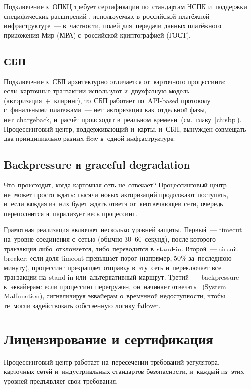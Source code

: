 Подключение к~ОПКЦ требует сертификации по~стандартам НСПК
и~поддержки специфических расширений , используемых
в~российской платёжной инфраструктуре~--- в~частности, полей
для~передачи данных платёжного приложения Мир (МРА)
с~российской криптографией (ГОСТ).

\subsection*{СБП}

Подключение к~СБП архитектурно отличается от~карточного
процессинга: если~карточные транзакции используют 
и~двухфазную модель (авторизация~+~клиринг), то~СБП работает
по~API-based протоколу с~финальными платежами~--- нет~авторизации
как~отдельной фазы, нет~chargeback, и~расчёт происходит
в~реальном времени~(см.~главу~\ref{ch:sbp}). Процессинговый
центр, поддерживающий и~карты, и~СБП, вынужден совмещать
два принципиально разных flow в~одной инфраструктуре.

\subsection*{Backpressure и graceful degradation}

Что~происходит, когда карточная сеть не~отвечает? Процессинговый
центр не~может просто ждать: тысячи новых авторизаций продолжают
поступать, и~если каждая из~них будет ждать ответа от~неотвечающей
сети, очередь переполнится и~парализует весь процессинг.

Грамотная реализация включает несколько уровней защиты.
Первый~--- timeout на~уровне соединения с~сетью (обычно
30--60~секунд), после которого транзакция либо~отклоняется,
либо~переводится в~stand-in. Второй~--- circuit breaker:
если доля timeout превышает порог (например, 50\% за~последнюю
минуту), процессинг прекращает отправку в~эту~сеть и~переключает
все транзакции на~stand-in или~альтернативный маршрут.
Третий~--- backpressure к~эквайерам: если процессинг перегружен,
он~начинает отвечать ~(System Malfunction), сигнализируя
эквайерам о~временной недоступности, чтобы те~могли задействовать
собственную логику failover.


\section{Лицензирование и сертификация}
\label{sec:pc-licensing}

Процессинговый центр работает на~пересечении требований
регулятора, карточных сетей и~индустриальных стандартов
безопасности, и~каждый из~этих уровней предъявляет свои
требования.

